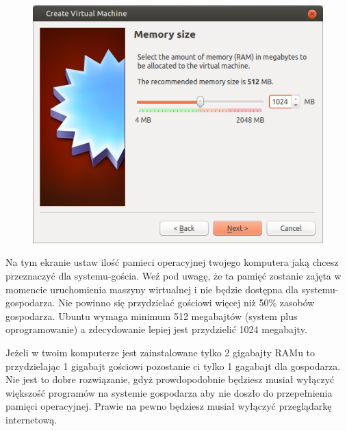 \begin{figure}
		\includegraphics[width=\linewidth]{images/virtualbox_wizard2.png}
\end{figure}
Na tym ekranie ustaw ilość pamieci operacyjnej twojego komputera jaką chcesz przeznaczyć dla systemu-gościa. Weź pod uwagę, że ta pamięć zostanie zajęta w momencie uruchomienia maszyny wirtualnej i nie będzie dostępna dla systemu-gospodarza. Nie powinno się przydzielać gościowi więcej niż 50\% zasobów gospodarza. Ubuntu wymaga minimum 512 megabajtów (system plus oprogramowanie) a zdecydowanie lepiej jest przydzielić 1024 megabajty.

Jeżeli w twoim komputerze jest zainstalowane tylko 2 gigabajty RAMu to przydzielając 1 gigabajt gościowi pozostanie ci tylko 1 gagabajt dla gospodarza. Nie jest to dobre rozwiązanie, gdyż prowdopodobnie będziesz musiał wyłączyć większość programów na systemie gospodarza aby nie doszło do przepełnienia pamięci operacyjnej. Prawie na pewno będziesz musiał wyłączyć przeglądarkę internetową. 

